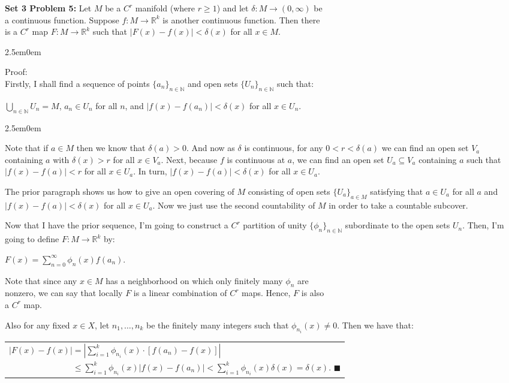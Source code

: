 \documentclass{book}
\newcommand{\Hstatement}{%
   \color{MidnightBlue!90!Black}%
   \fontsize{12}{13}\selectfont%
}
\newcommand{\HexOne}{%
   \color{Purple}%
   \fontsize{12}{13}\selectfont%
}
\newcommand{\HexTwoP}{%
   \color{RedViolet}%
   \fontsize{12}{13}\selectfont%
}
\newenvironment{myIndent}{%
   \begin{adjustwidth}{2.5em}{0em}%
}{%
   \end{adjustwidth}%
}
\newcommand{\blab}[1]{\textbf{#1}}
\newcommand{\retTwo}{\hfill\bigbreak}
\begin{document}
\Hstatement\blab{Set 3 Problem 5:} Let $M$ be a $C^r$ manifold (where $r \geq 1$) and let $\delta: M \to (0, \infty)$ be\\ a continuous function. Suppose $f: M \to \mathbb{R}^k$ is another continuous function. Then there\\ [2pt] is a $C^r$ map $F: M \to \mathbb{R}^k$ such that $|F(x) - f(x)| < \delta(x)$ for all $x \in M$.
\begin{myIndent}\HexOne
	Proof:\\
	Firstly, I shall find a sequence of points $\{a_n\}_{n \in \mathbb{N}}$ and open sets $\{U_n\}_{n \in \mathbb{N}}$ such that:
	
	{\centering$\bigcup_{n \in \mathbb{N}}U_n = M$, $a_n \in U_n$ for all $n$, and $|f(x) - f(a_n)| < \delta(x)$ for all $x \in U_n$.\\ [6pt]\par}

	\begin{myIndent}\HexTwoP
		Note that if $a \in M$ then we know that $\delta(a) > 0$. And now as $\delta$ is continuous, for any $0 < r < \delta(a)$ we can find an open set $V_a$ containing $a$ with $\delta(x) > r$ for all $x \in V_a$. Next, because $f$ is continuous at $a$, we can find an open set $U_a \subseteq V_a$ containing $a$ such that $|f(x) - f(a)| < r$ for all $x \in U_a$. In turn, $|f(x) - f(a)| < \delta(x)$ for all $x \in U_a$.\retTwo

		The prior paragraph shows us how to give an open covering of $M$ consisting of open sets $\{U_a\}_{a \in M}$ satisfying that $a \in U_a$ for all $a$ and $|f(x) - f(a)| < \delta(x)$ for all $x \in U_a$. Now we just use the second countability of $M$ in order to take a countable subcover.\retTwo
	\end{myIndent}

	Now that I have the prior sequence, I'm going to construct a $C^r$ partition of unity $\{\phi_n\}_{n \in \mathbb{N}}$ subordinate to the open sets $U_n$. Then, I'm going to define $F: M \to \mathbb{R}^k$ by:
	
	{\center$F(x) = \sum_{n = 0}^\infty \phi_n(x)f(a_n)$.\retTwo\par}

	Note that since any $x \in M$ has a neighborhood on which only finitely many $\phi_n$ are\\ nonzero, we can say that locally $F$ is a linear combination of $C^r$ maps. Hence, $F$ is also\\ a $C^r$ map.\retTwo

	Also for any fixed $x \in X$, let $n_1, \ldots, n_k$ be the finitely many integers such that $\phi_{n_i}(x) \neq 0$. Then we have that:

	{\centering\begin{tabular}{l}
		$|F(x) - f(x)| = \left|\sum_{i=1}^k \phi_{n_i}(x) \cdot [f(a_n) - f(x)]\right|$\\ [8pt]
		$\phantom{|F(x) - f(x)|} \leq \sum_{i=1}^k \phi_{n_i}(x) |f(x) - f(a_n)| < \sum_{i=1}^k \phi_{n_i}(x) \delta(x) = \delta(x)$. $\blacksquare$
	\end{tabular} \retTwo\par}
\end{myIndent}
\end{document}
